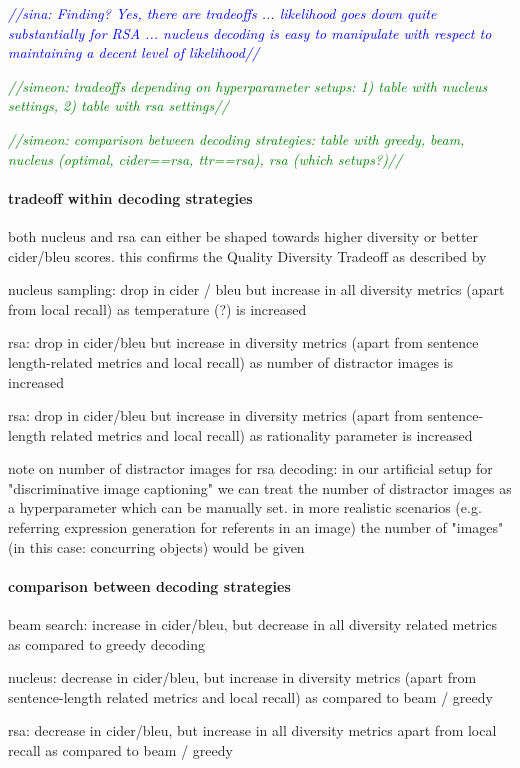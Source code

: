 \documentclass[11pt,a4paper]{article}
\newcommand{\sina}[1]{\textcolor{blue}{\emph{//sina: #1//}}}
\newcommand{\simeon}[1]{\textcolor{green}{\emph{//simeon: #1//}}}
\begin{document}
\sina{Finding? Yes, there are tradeoffs ... likelihood goes down quite substantially for RSA ... nucleus decoding is easy to manipulate with respect to maintaining a decent level of likelihood}

\simeon{tradeoffs depending on hyperparameter setups: 1) table with nucleus settings, 2) table with rsa settings}

\simeon{comparison between decoding strategies: table with greedy, beam, nucleus (optimal, cider==rsa, ttr==rsa), rsa (which setups?)}

\paragraph{tradeoff within decoding strategies} both nucleus and rsa can either be shaped towards higher diversity or better cider/bleu scores. this confirms the Quality Diversity Tradeoff as described by \citep{Ippolito2019}

nucleus sampling: drop in cider / bleu but increase in all diversity metrics (apart from local recall)  as temperature (?) is increased
    
rsa: drop in cider/bleu but increase in diversity metrics (apart from sentence length-related metrics and local recall) as number of distractor images is increased

rsa: drop in cider/bleu but increase in diversity metrics (apart from sentence-length related metrics and local recall) as rationality parameter is increased
    
note on number of distractor images for rsa decoding: in our artificial setup for "discriminative image captioning" we can treat the number of distractor images as a hyperparameter which can be manually set. in more realistic scenarios (e.g. referring expression generation for referents in an image) the number of "images" (in this case: concurring objects) would be given

\paragraph{comparison between decoding strategies}
beam search: increase in cider/bleu, but decrease in all diversity related metrics as compared to greedy decoding

nucleus: decrease in cider/bleu, but increase in diversity metrics (apart from sentence-length related metrics and local recall) as compared to beam / greedy

rsa: decrease in cider/bleu, but increase in all diversity metrics apart from local recall as compared to beam / greedy
\end{document}
